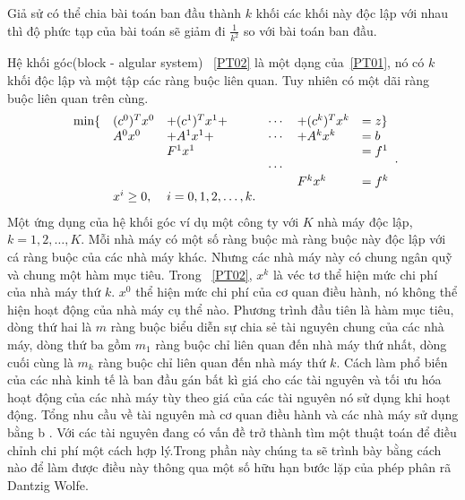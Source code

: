 Giả sử có thể chia bài toán ban đầu thành $k$ khối các khối này độc lập với nhau thì độ phức tạp của bài toán sẽ giảm đi $\frac{1}{k^2}$ so với bài toán ban đầu. 

Hệ khối góc(block - algular system) ~\ref{PT02} là một dạng của~\ref{PT01}, nó có $k$ khối độc lập và một tập các ràng buộc liên quan. Tuy nhiên có một dãi ràng buộc liên quan trên cùng.
\begin{equation}\label{PT02}
 \begin{array}{llllll}
\min\{ &(c^0)^T x^0 &+ (c^1)^T x^1 +& \cdots &+ (c^k)^T x^k &= z \}\\
& A^0 x^0 & + A^1 x^1 +& \cdots &+ A^k x^k & = b\\
&&F^1 x^1 & & &= f^1\\
&&&\cdots\\
&& & & F^k x^k &= f^k\\
&x^i \geq 0, &i = 0, 1, 2, \ldots, k.
\end{array} .
\end{equation}
Một ứng dụng của hệ khối góc ví dụ một công ty với $K$ nhà máy độc lập, $k = 1, 2,\ldots,K$. Mỗi nhà máy có một số ràng buộc mà ràng buộc này độc lập với cá ràng buộc của các nhà máy khác. Nhưng các nhà máy này có chung ngân quỹ và chung một hàm mục tiêu. Trong ~\ref{PT02}, $x^k$ là véc tơ thể hiện mức chi phí của nhà máy thứ $k$. $x^0$ thể hiện mức chi phí của cơ quan điều hành, nó không thể hiện hoạt động của nhà máy cụ thể nào. Phương trình đầu tiên là hàm mục tiêu, dòng thứ hai là $m$ ràng buộc biểu diễn sự chia sẻ tài nguyên chung của các nhà máy, dòng thứ ba gồm $m_1$ ràng buộc chỉ liên quan đến nhà máy thứ nhất, dòng cuối cùng là $m_k$ ràng buộc chỉ liên quan đến nhà máy thứ $k$. Cách làm phổ biến của các nhà kinh tế là ban đầu gán bất kì giá cho các tài nguyên và tối ưu hóa hoạt động của các nhà máy tùy theo giá của các tài nguyên nó sử dụng khi hoạt động. Tổng nhu cầu về tài nguyên mà cơ quan điều hành và các nhà máy sử dụng bằng b . Với các tài nguyên đang có vấn đề trở thành tìm một thuật toán để điều chỉnh chi phí một cách hợp lý.Trong phần này chúng ta sẽ trình bày bằng cách nào để làm được điều này thông qua một số hữu hạn bước lặp của phép phân rã Dantzig Wolfe.

